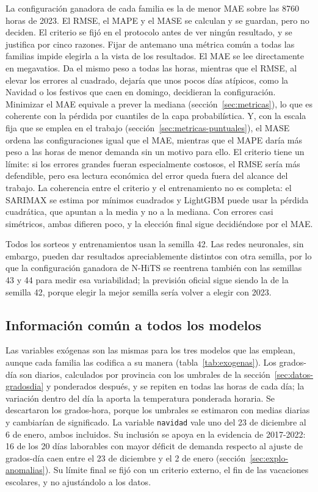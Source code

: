 La configuración ganadora de cada familia es la de menor MAE sobre las 8760
horas de 2023. El RMSE, el MAPE y el MASE se calculan y se guardan, pero no
deciden. El criterio se fijó en el protocolo antes de ver ningún resultado, y
se justifica por cinco razones. Fijar de antemano una métrica común a todas las familias
impide elegirla a la vista de los resultados. El MAE se lee directamente en
megavatios. Da el mismo peso a todas las horas, mientras que el RMSE, al
elevar los errores al cuadrado, dejaría que unos pocos días atípicos, como la
Navidad o los festivos que caen en domingo, decidieran la configuración.
Minimizar el MAE equivale a prever la mediana (sección~\ref{sec:metricas}),
lo que es coherente con la pérdida por cuantiles de la capa probabilística.
Y, con la escala fija que se emplea en el trabajo
(sección~\ref{sec:metricas-puntuales}), el MASE ordena las configuraciones
igual que el MAE, mientras que el MAPE daría más peso a las
horas de menor demanda sin un motivo para ello. El criterio tiene un límite:
si los errores grandes fueran especialmente costosos, el RMSE sería más
defendible, pero esa lectura económica del error queda fuera del alcance del
trabajo. La coherencia entre el criterio y el entrenamiento no es completa:
el SARIMAX se estima por mínimos cuadrados y LightGBM puede usar la pérdida
cuadrática, que apuntan a la media y no a la mediana. Con errores casi
simétricos, ambas difieren poco, y la elección final sigue decidiéndose por
el MAE.

Todos los sorteos y entrenamientos usan la semilla 42. Las redes neuronales,
sin embargo, pueden dar resultados apreciablemente distintos con otra
semilla, por lo que la configuración ganadora de N-HiTS se reentrena también
con las semillas 43 y 44 para medir esa variabilidad; la previsión oficial
sigue siendo la de la semilla 42, porque elegir la mejor semilla sería
volver a elegir con 2023.

\subsection{Información común a todos los modelos}\label{sec:prot-informacion}

Las variables exógenas son las mismas para los tres modelos que las
emplean, aunque cada familia las codifica a su manera
(tabla~\ref{tab:exogenas}). Los grados-día son diarios, calculados por
provincia con los umbrales de la sección~\ref{sec:datos-gradosdia} y
ponderados después, y se repiten en todas las horas de cada día; la variación
dentro del día la aporta la temperatura ponderada horaria. Se descartaron los
grados-hora, porque los umbrales se estimaron con medias diarias y
cambiarían de significado. La variable \texttt{navidad} vale uno del 23 de
diciembre al 6 de enero, ambos incluidos. Su inclusión se apoya en la
evidencia de 2017-2022: 16 de los 20 días laborables con mayor déficit de
demanda respecto al ajuste de grados-día caen entre el 23 de diciembre y el 2
de enero (sección~\ref{sec:explo-anomalias}). Su límite final se fijó con un
criterio externo, el fin de las vacaciones escolares, y no ajustándolo a los
datos.

